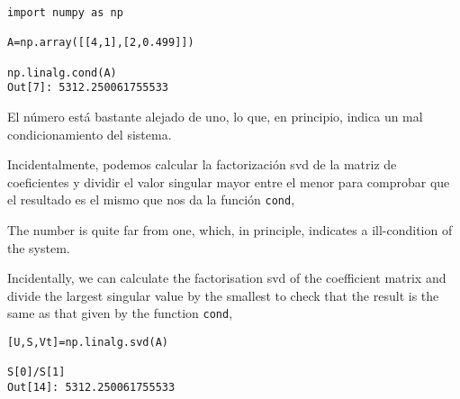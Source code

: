 \begin{verbatim}
import numpy as np

A=np.array([[4,1],[2,0.499]])

np.linalg.cond(A)
Out[7]: 5312.250061755533
\end{verbatim}

\begin{paracol}{2}
El número está bastante alejado de uno, lo que, en principio, indica un mal condicionamiento del sistema. 

Incidentalmente, podemos calcular la factorización svd de la matriz de coeficientes y dividir el valor singular mayor entre el menor para comprobar que el resultado es el mismo que nos da la función \texttt{cond},

\switchcolumn
The number is quite far from one, which, in principle, indicates a ill-condition of the system. 

Incidentally, we can calculate the factorisation svd of the coefficient matrix and divide the largest singular value by the smallest to check that the result is the same as that given by the function \texttt{cond},
\end{paracol}

\begin{verbatim}
[U,S,Vt]=np.linalg.svd(A)

S[0]/S[1]
Out[14]: 5312.250061755533
\end{verbatim}

